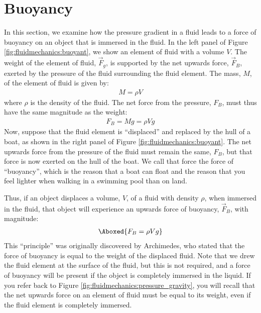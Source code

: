 {{\section{Buoyancy}
In this section, we examine how the pressure gradient in a fluid leads to a force of buoyancy on an object that is immersed in the fluid.
In the left panel of Figure \ref{fig:fluidmechanics:buoyant}, we show an element of fluid with a volume $V$. The weight of the element of fluid, $\vec F_g$, is supported by the net upwards force, $\vec F_B$, exerted by the pressure of the fluid surrounding the fluid element. The mass, $M$, of the element of fluid is given by:
\begin{align*}
M = \rho V
\end{align*} 
where $\rho$ is the density of the fluid. The net force from the pressure, $F_B$, must thus have the same magnitude as the weight:
\begin{align*}
F_B = Mg = \rho V g
\end{align*}
Now, suppose that the fluid element is ``displaced'' and replaced by the hull of a boat, as shown in the right panel of Figure \ref{fig:fluidmechanics:buoyant}. The net upwards force from the pressure of the fluid must remain the same, $F_B$, but that force is now exerted on the hull of the boat. We call that force the force of ``buoyancy'', which is the reason that a boat can float and the reason that you feel lighter when walking in a swimming pool than on land. 

Thus, if an object displaces a volume, $V$, of a fluid with density $\rho$, when immersed in the fluid, that object will experience an upwards force of buoyancy, $\vec F_B$, with magnitude:
\begin{align}
\Aboxed{F_B = \rho V g}
\end{align} 
This ``principle'' was originally discovered by Archimedes, who stated that the force of buoyancy is equal to the weight of the displaced fluid. Note that we drew the fluid element at the surface of the fluid, but this is not required, and a force of buoyancy will be present if the object is completely immersed in the liquid. If you refer back to Figure \ref{fig:fluidmechanics:pressure_gravity}, you will recall that the net upwards force on an element of fluid must be equal to its weight, even if the fluid element is completely immersed.

}}
